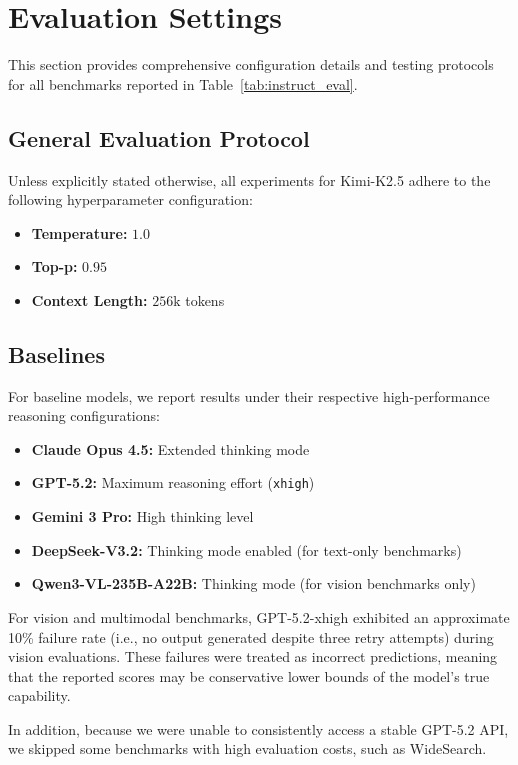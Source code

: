 \section{Evaluation Settings}
\label{app:eval_details}

This section provides comprehensive configuration details and testing protocols for all benchmarks reported in Table~\ref{tab:instruct_eval}.

\subsection{General Evaluation Protocol}
\label{app:eval_general}

Unless explicitly stated otherwise, all experiments for Kimi-K2.5 adhere to the following hyperparameter configuration:
\begin{itemize}
    \item \textbf{Temperature:} $1.0$
    \item \textbf{Top-p:} $0.95$
    \item \textbf{Context Length:} $256\text{k}$ tokens
\end{itemize}

\subsection{Baselines}
For baseline models, we report results under their respective high-performance reasoning configurations:
\begin{itemize}
    \item \textbf{Claude Opus 4.5:} Extended thinking mode
    \item \textbf{GPT-5.2:} Maximum reasoning effort (\texttt{xhigh})
    \item \textbf{Gemini 3 Pro:} High thinking level
    \item \textbf{DeepSeek-V3.2:} Thinking mode enabled (for text-only benchmarks)
    \item \textbf{Qwen3-VL-235B-A22B:} Thinking mode (for vision benchmarks only)
\end{itemize}

For vision and multimodal benchmarks, GPT-5.2-xhigh exhibited an approximate 10\% failure rate (i.e., no output generated despite three retry attempts) during vision evaluations. These failures were treated as incorrect predictions, meaning that the reported scores may be conservative lower bounds of the model’s true capability.

In addition, because we were unable to consistently access a stable GPT-5.2 API, we skipped some benchmarks with high evaluation costs, such as WideSearch.

